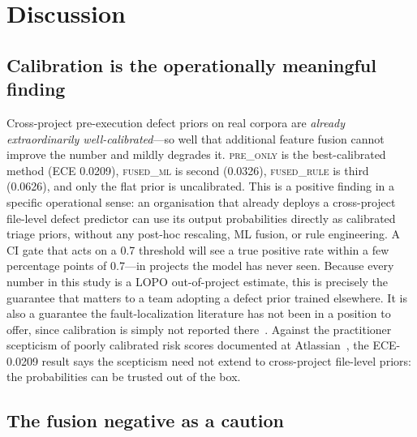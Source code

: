 \documentclass[preprint,12pt]{elsarticle}
\begin{document}
\section{Discussion}
\label{sec:discussion}

\subsection{Calibration is the operationally meaningful finding}

Cross-project pre-execution defect priors on real corpora are \emph{already extraordinarily well-calibrated}---so well that additional feature fusion cannot improve the number and mildly degrades it. \textsc{pre\_only} is the best-calibrated method (ECE 0.0209), \textsc{fused\_ml} is second (0.0326), \textsc{fused\_rule} is third (0.0626), and only the flat prior is uncalibrated. This is a positive finding in a specific operational sense: an organisation that already deploys a cross-project file-level defect predictor can use its output probabilities directly as calibrated triage priors, without any post-hoc rescaling, ML fusion, or rule engineering. A CI gate that acts on a 0.7 threshold will see a true positive rate within a few percentage points of 0.7---in projects the model has never seen. Because every number in this study is a LOPO out-of-project estimate, this is precisely the guarantee that matters to a team adopting a defect prior trained elsewhere. It is also a guarantee the fault-localization literature has not been in a position to offer, since calibration is simply not reported there~\cite{yang2024llmao,kang2024llmfl,rezaalipour2024pyfl}. Against the practitioner scepticism of poorly calibrated risk scores documented at Atlassian~\cite{hong2024atlassian}, the ECE-0.0209 result says the scepticism need not extend to cross-project file-level priors: the probabilities can be trusted out of the box.

\subsection{The fusion negative as a caution}
\end{document}

